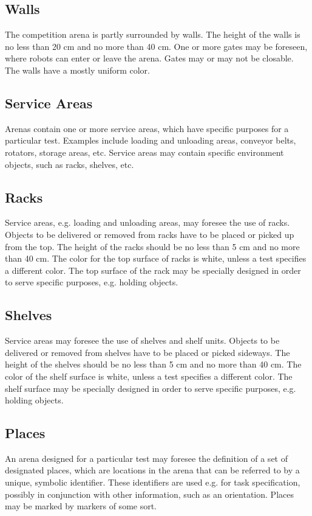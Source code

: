 \subsection{Walls}
The competition arena is partly surrounded by walls. The height of the walls is no less than 20 cm and no more than 40 cm. One or more gates may be foreseen, where robots can enter or leave the arena. Gates may or may not be closable. The walls have a mostly uniform color.

\subsection{Service Areas}
Arenas contain one or more service areas, which have specific purposes for a particular test. Examples include loading and unloading areas, conveyor belts, rotators, storage areas, etc. Service areas may contain specific environment objects, such as racks, shelves, etc.

\subsection{Racks}
Service areas, e.g. loading and unloading areas, may foresee the use of racks. Objects to be delivered or removed from racks have to be placed or picked up from the top. The height of the racks should be no less than 5 cm and no more than 40 cm. The color for the top surface of racks is white, unless a test specifies a different color. The top surface of the rack may be specially designed in order to serve specific purposes, e.g. holding objects.

\subsection{Shelves}
Service areas may foresee the use of shelves and shelf units. Objects to be delivered or removed from shelves have to be placed or picked sideways. The height of the shelves should be no less than 5 cm and no more than 40 cm. The color of the shelf surface is white, unless a test specifies a different color. The shelf surface may be specially designed in order to serve specific purposes, e.g. holding objects.

\subsection{Places}
An arena designed for a particular test may foresee the definition of a set of designated places, which are locations in the arena that can be referred to by a unique, symbolic identifier. These identifiers are used e.g. for task specification, possibly in conjunction with other information, such as an orientation. Places may be marked by markers of some sort.

